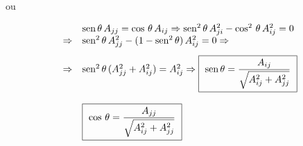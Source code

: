 \noindent
ou

\[
 \begin{array}{ll}
              & \mbox{sen} \, \theta \, A_{jj} = \cos \, \theta \, A_{ij} \Rightarrow \mbox{sen}^2 \, \theta \, A_{ji}^2 - \cos^2 \, \theta \, A_{ij}^2 = 0 \\ \vspace*{0.3cm}
  \Rightarrow & \mbox{sen}^2 \, \theta \, A_{jj}^2 - (1 - \mbox{sen}^2 \, \theta) \, A_{ij}^2 = 0 \Rightarrow \\
  \Rightarrow & \mbox{sen}^2 \, \theta \, (A_{jj}^2 + A_{ij}^2) = A_{ij}^2 \Rightarrow \mbox{\framebox{ $ \mbox{sen} \, \theta = \displaystyle \frac{A_{ij}}{\sqrt{A_{ij}^2 + A_{jj}^2}} $ }}\\ \\
              & \mbox{\framebox{ $ \cos \, \theta = \displaystyle \frac{A_{jj}}{\sqrt{A_{ij}^2 + A_{jj}^2}} $ }}
 \end{array}
\]
